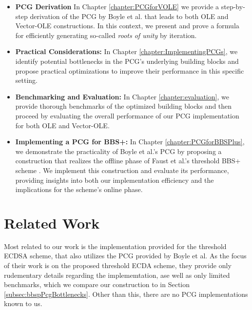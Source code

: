 \begin{itemize}
\item \textbf{PCG Derivation} In Chapter \ref{chapter:PCGforVOLE} we provide a step-by-step derivation of the PCG by Boyle et al. that leads to both OLE and Vector-OLE constructions. In this context, we present and prove a formula for efficiently generating so-called \textit{roots of unity} by iteration.
\item \textbf{Practical Considerations:} In Chapter \ref{chapter:ImplementingPCGs}, we identify potential bottlenecks in the PCG's underlying building blocks and propose practical optimizations to improve their performance in this specific setting.
\item \textbf{Benchmarking and Evaluation:} In Chapter \ref{chapter:evaluation}, we provide thorough benchmarks of the optimized building blocks and then proceed by evaluating the overall performance of our PCG implementation for both OLE and Vector-OLE.
\item \textbf{Implementing a PCG for BBS+:} In Chapter \ref{chapter:PCGforBBSPlus}, we demonstrate the practicality of Boyle et al.'s PCG by proposing a construction that realizes the offline phase of Faust et al.'s threshold BBS+ scheme \cite{cryptoeprint:2023/1076}. We implement this construction and evaluate its performance, providing insights into both our implementation efficiency and the implications for the scheme's online phase.
\end{itemize}

\section{Related Work}
Most related to our work is the implementation provided for the threshold ECDSA scheme, that also utilizes the PCG provided by Boyle et al. As the focus of their work is on the proposed threshold ECDA scheme, they provide only rudementary details regarding the implememtation, ase well as only limited benchmarks, which we compare our construction to in Section \ref{subsec:bbspPcgBottlenecks}. Other than this, there are no PCG implementations known to us.